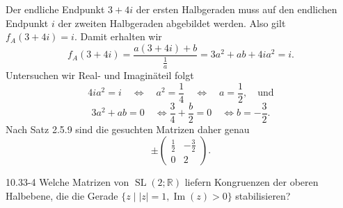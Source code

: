 Der endliche Endpunkt \(3+4i\) der ersten Halbgeraden muss auf den
endlichen Endpunkt \(i\) der zweiten Halbgeraden abgebildet werden.
Also gilt \(f_A(3+4i)=i\).
Damit erhalten wir
\[
    f_A(3+4i)=\frac{a(3+4i)+b}{\frac{1}{a}}=3a^2+ab+4ia^2=i.
\]
Untersuchen wir Real- und Imaginäteil folgt
\[
    4ia^2 = i \quad
    \Longleftrightarrow \quad a^2 = \frac{1}{4} \quad
    \Longleftrightarrow \quad a = \frac{1}{2}, \quad \text{und}
\]
\[
    3a^2+ab = 0 \quad 
    \Longleftrightarrow \frac{3}{4}+\frac{b}{2} = 0 \quad
    \Longleftrightarrow b = -\frac{3}{2}.
\]
Nach Satz 2.5.9 sind die gesuchten Matrizen daher genau
\[
    \boxed{
        \pm
        \begin{pmatrix}
            \frac12 & -\frac32\\
            0 & 2
        \end{pmatrix}.
    }
\]

\begin{exercise}{10.3}{3-4}
    Welche Matrizen von $\operatorname{SL}(2; \mathbb R)$ liefern Kongruenzen
    der oberen Halbebene, die die Gerade $\{z \mid |z| = 1, \operatorname{Im}(z) > 0\}$ stabilisieren?
\end{exercise}

